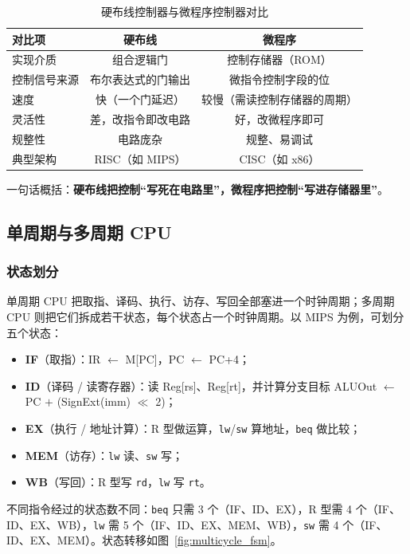 \begin{table}[H]
\centering
\caption{硬布线控制器与微程序控制器对比}
\label{tab:hw_vs_micro}
\begin{tabulary}{\textwidth}{LCC}
\toprule
\textbf{对比项} & \textbf{硬布线} & \textbf{微程序} \\
\midrule
实现介质 & 组合逻辑门 & 控制存储器（ROM） \\
控制信号来源 & 布尔表达式的门输出 & 微指令控制字段的位 \\
速度 & 快（一个门延迟） & 较慢（需读控制存储器的周期） \\
灵活性 & 差，改指令即改电路 & 好，改微程序即可 \\
规整性 & 电路庞杂 & 规整、易调试 \\
典型架构 & RISC（如 MIPS） & CISC（如 x86） \\
\bottomrule
\end{tabulary}
\end{table}

一句话概括：\textbf{硬布线把控制“写死在电路里”，微程序把控制“写进存储器里”}。

\subsection{单周期与多周期 CPU}

\subsubsection{状态划分}

单周期 CPU 把取指、译码、执行、访存、写回全部塞进一个时钟周期；多周期 CPU 则把它们拆成若干状态，每个状态占一个时钟周期。以 MIPS 为例，可划分五个状态：

\begin{itemize}
    \item \textbf{IF}（取指）：IR $\leftarrow$ M[PC]，PC $\leftarrow$ PC+4；
    \item \textbf{ID}（译码 / 读寄存器）：读 Reg[rs]、Reg[rt]，并计算分支目标 ALUOut $\leftarrow$ PC $+$ (SignExt(imm) $\ll$ 2)；
    \item \textbf{EX}（执行 / 地址计算）：R 型做运算，\texttt{lw}/\texttt{sw} 算地址，\texttt{beq} 做比较；
    \item \textbf{MEM}（访存）：\texttt{lw} 读、\texttt{sw} 写；
    \item \textbf{WB}（写回）：R 型写 \texttt{rd}，\texttt{lw} 写 \texttt{rt}。
\end{itemize}

不同指令经过的状态数不同：\texttt{beq} 只需 3 个（IF、ID、EX），R 型需 4 个（IF、ID、EX、WB），\texttt{lw} 需 5 个（IF、ID、EX、MEM、WB），\texttt{sw} 需 4 个（IF、ID、EX、MEM）。状态转移如图~\ref{fig:multicycle_fsm}。

